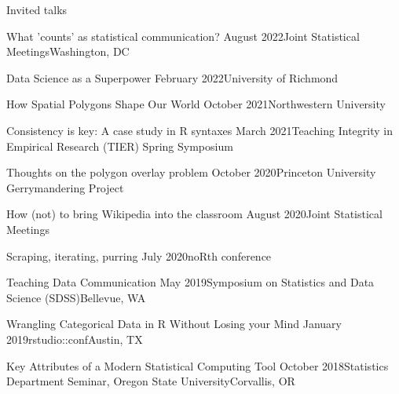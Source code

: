 \documentclass{resume} %
\begin{document}
\begin{rSection}{Invited talks}

\begin{sSubsection}{What 'counts' as statistical communication?}{ }{August 2022}{Joint Statistical Meetings}{Washington, DC}
\end{sSubsection}

\begin{sSubsection}{Data Science as a Superpower}{ }{February 2022}{University of Richmond}{}
\end{sSubsection}

\begin{sSubsection}{How Spatial Polygons Shape Our World}{ }{October 2021}{Northwestern University}{}
\end{sSubsection}

\begin{sSubsection}{Consistency is key: A case study in R syntaxes}{ }{March 2021}{Teaching Integrity in Empirical Research (TIER) Spring Symposium}{}
\end{sSubsection}


\begin{sSubsection}{Thoughts on the polygon overlay problem}{ }{October 2020}{Princeton University Gerrymandering Project}{}
\end{sSubsection}

\begin{sSubsection}{How (not) to bring Wikipedia into the classroom}{ }{August 2020}{Joint Statistical Meetings}{}
\end{sSubsection}

\begin{sSubsection}{Scraping, iterating, purring}{ }{July 2020}{noRth conference}{}
\end{sSubsection}

\begin{sSubsection}{Teaching Data Communication}{ }{May 2019}{Symposium on Statistics and Data Science (SDSS)}{Bellevue, WA}
\end{sSubsection}

\begin{sSubsection}{Wrangling Categorical Data in R Without Losing your Mind}{ }{January 2019}{rstudio::conf}{Austin, TX}
\end{sSubsection}

\begin{sSubsection}{Key Attributes of a Modern Statistical Computing Tool}{ }{October 2018}{Statistics Department Seminar, Oregon State University}{Corvallis, OR}
\end{sSubsection}


\end{rSection}
\end{document}
